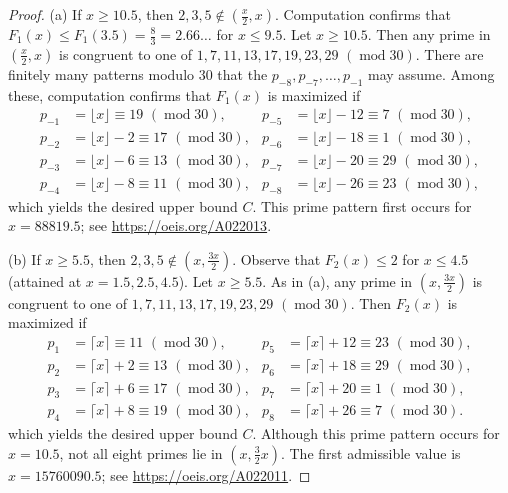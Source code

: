 \documentclass[10pt,reqno]{amsart}
\theoremstyle{plain}
\theoremstyle{definition}
\newcommand{\ceiling}[1]{\lceil #1 \rceil}
\newcommand{\floor}[1]{\lfloor #1 \rfloor}
\renewcommand{\pmod}[1]{\,\,(\operatorname{mod}#1)}
\begin{document}
\vspace{-10pt}
\begin{proof}
    (a) If $x \geq 10.5$, then $2,3,5 \notin (\frac{x}{2},x)$.  Computation confirms that
    $F_1(x) \leq F_1(3.5) = \frac{8}{3} =2.66\ldots$ for $x \leq 9.5$.  Let $x \geq 10.5$.
    Then any prime in $(\frac{x}{2},x)$ is 
    congruent to one of $1, 7, 11, 13, 17, 19, 23, 29 \pmod{30}$.  
    There are finitely many patterns modulo $30$ that the $p_{-8},p_{-7},\ldots,p_{-1}$ may assume.
    Among these, computation confirms that $F_1(x)$ is maximized if 
    \begin{align*}
        p_{-1} &= \floor{x} \equiv 19\pmod{30},  & p_{-5} &= \floor{x}-12 \equiv 7\pmod{30},\\
        p_{-2} &= \floor{x}-2 \equiv 17\pmod{30},  & p_{-6} &= \floor{x}-18 \equiv 1\pmod{30},\\
        p_{-3} &= \floor{x}-6 \equiv 13\pmod{30},  & p_{-7} &= \floor{x}-20 \equiv 29\pmod{30},\\
        p_{-4} &= \floor{x}-8 \equiv 11\pmod{30},  & p_{-8} &= \floor{x}-26 \equiv 23\pmod{30},
    \end{align*}
    which yields the desired upper bound $C$.
    This prime pattern first occurs for $x = 88819.5$;
    see \url{https://oeis.org/A022013}.
        
    \medskip\noindent(b) If $x \geq 5.5$, then $2,3,5 \notin (x, \frac{3x}{2})$.  Observe that
    $F_2(x) \leq 2$ for $x \leq 4.5$ (attained at $x=1.5, 2.5, 4.5$).  Let $x \geq 5.5$.
    As in (a), any prime in $(x,\frac{3x}{2})$ is 
    congruent to one of $1, 7, 11, 13, 17, 19, 23, 29 \pmod{30}$.  
    Then $F_2(x)$ is maximized if 
    \begin{align*}
        p_{1} &= \ceiling{x} \equiv 11\pmod{30},  & p_{5} &= \ceiling{x}+12 \equiv 23\pmod{30},\\
        p_{2} &= \ceiling{x}+2 \equiv 13\pmod{30},  & p_{6} &= \ceiling{x}+18 \equiv 29\pmod{30},\\
        p_{3} &= \ceiling{x}+6 \equiv 17\pmod{30},  & p_{7} &= \ceiling{x}+20 \equiv 1\pmod{30}, \\
        p_{4} &= \ceiling{x}+8 \equiv 19\pmod{30}, & p_8 &= \ceiling{x} + 26 \equiv 7 \pmod{30}.
    \end{align*}
    which yields the desired upper bound $C$.
    Although this prime pattern occurs for $x=10.5$, not all eight primes lie in $(x,\frac{3}{2}x)$.    
    The first admissible value is $x = 15760090.5$; see \url{https://oeis.org/A022011}.
\end{proof}
\end{document}

